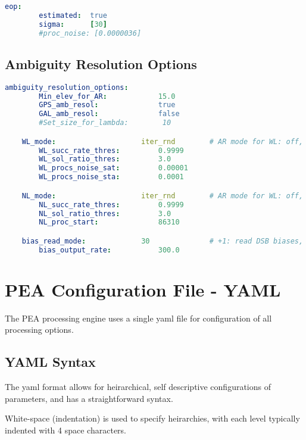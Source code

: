 \begin{lstlisting}[language=yaml,caption=yaml input files configuration example]
	eop:
		estimated:  true
		sigma:      [30]
		#proc_noise: [0.0000036]

\end{lstlisting}


\section{Ambiguity Resolution Options}
%

\begin{lstlisting}[language=yaml,caption=yaml ambiguity configuration example]
	ambiguity_resolution_options:
		Min_elev_for_AR:            15.0
		GPS_amb_resol:              true
		GAL_amb_resol:              false
		#Set_size_for_lambda:        10

	WL_mode:                    iter_rnd        # AR mode for WL: off, round, iter_rnd, bootst, lambda, lambda_alt, lambda_al2, lambda_bie
		WL_succ_rate_thres:         0.9999
		WL_sol_ratio_thres:         3.0
		WL_procs_noise_sat:         0.00001
		WL_procs_noise_sta:         0.0001

	NL_mode:                    iter_rnd        # AR mode for WL: off, round, iter_rnd, bootst, lambda, lambda_alt, lambda_al2, lambda_bie
		NL_succ_rate_thres:         0.9999
		NL_sol_ratio_thres:         3.0
		NL_proc_start:              86310

	bias_read_mode:             30              # +1: read DSB biases, +2: read OSB biases, +4: read code biases, +8: read phase biases, +16: read satellite bias, +32: read station bias,
		bias_output_rate:           300.0
\end{lstlisting}
\chapter{PEA Configuration File - YAML}
	
The PEA processing engine uses a single yaml file for configuration of all processing options.

\section{YAML Syntax}
The yaml format allows for heirarchical, self descriptive configurations of parameters, and has a straightforward syntax.

White-space (indentation) is used to specify heirarchies, with each level typically indented with 4 space characters.

